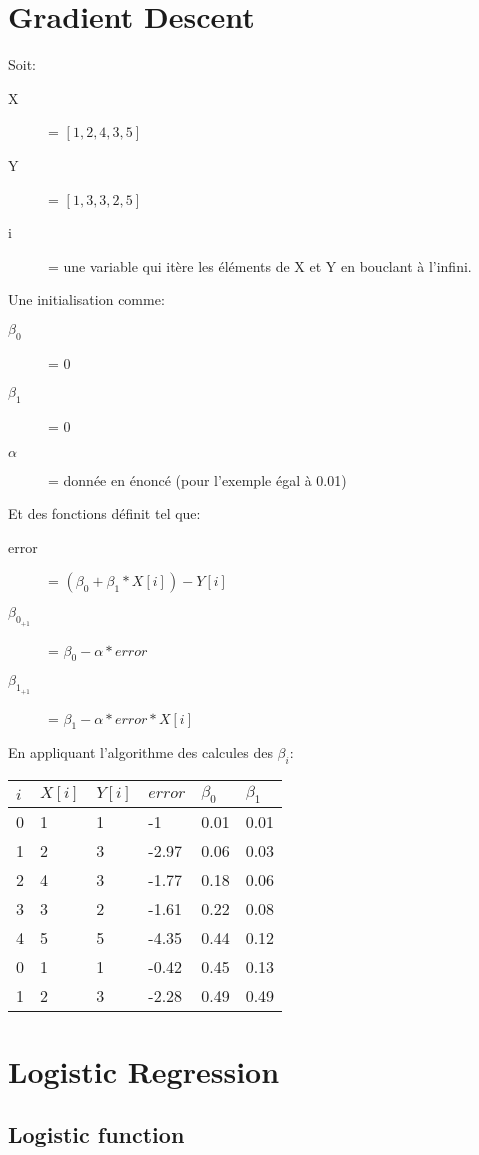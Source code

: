 \section{Gradient Descent}
Soit:
\begin{description}
\item[X] = $[1,2,4,3,5]$
\item[Y] = $[1,3,3,2,5]$
\item[i] = une variable qui itère les éléments de X et Y en bouclant à l'infini.
\end{description}
Une initialisation comme:
\begin{description}
\item[$\beta_0$] = 0
\item[$\beta_1$] = 0
\item[$\alpha$] = donnée en énoncé (pour l'exemple égal à 0.01)
\end{description}
Et des fonctions définit tel que:
\begin{description}
\item[error] = $(\beta_0 + \beta_1 * X[i]) - Y[i]$
\item[$\beta_{0_{+1}}$] = $\beta_0 - \alpha * error$
\item[$\beta_{1_{+1}}$] = $\beta_1 - \alpha * error * X[i]$
\end{description}

En appliquant l'algorithme des calcules des $\beta_i$:\\
\begin{tabular}{l|l|l|l|l|l}
  \hline
  $ i $ & $ X[i] $ &  $Y[i] $ &  $error $ & $ \beta_0 $ & $ \beta_1 $\\
  \hline
  0 & 1 & 1 & -1 & 0.01 & 0.01 \\
  1 & 2 & 3 & -2.97 & 0.06 & 0.03\\
  2 & 4 & 3 & -1.77 & 0.18 & 0.06\\
  3 & 3 & 2 & -1.61 & 0.22 & 0.08\\
  4 & 5 & 5 & -4.35 & 0.44 & 0.12\\
  0 & 1 & 1 & -0.42 & 0.45 & 0.13\\
  1 & 2 & 3 & -2.28 & 0.49 & 0.49\\
  \hline
\end{tabular}
\pagebreak
\section{Logistic Regression}
\subsection{Logistic function}

